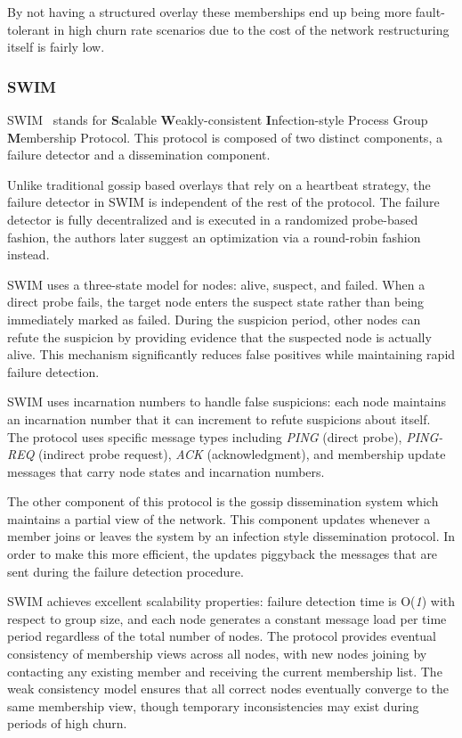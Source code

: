By not having a structured overlay these memberships end up being more fault-tolerant
in high churn rate scenarios due to the cost of the network restructuring
itself is fairly low.

\subsubsection{SWIM}\label{subsec:swim}

SWIM~\cite{swim} stands for \textbf{S}calable \textbf{W}eakly-consistent \textbf{I}nfection-style
Process Group \textbf{M}embership Protocol. This protocol is composed of two distinct
components, a failure detector and a dissemination component.

Unlike traditional gossip based overlays that rely on a heartbeat strategy,
the failure detector in SWIM is independent of the rest of the protocol.
The failure detector is fully decentralized and is executed in a randomized
probe-based fashion, the authors later suggest an optimization via a round-robin
fashion instead.

SWIM uses a three-state model for nodes: alive, suspect, and failed. When a direct probe fails,
the target node enters the suspect state rather than being immediately marked as failed.
During the suspicion period, other nodes can refute the suspicion by providing evidence
that the suspected node is actually alive. This mechanism significantly reduces false positives
while maintaining rapid failure detection.

SWIM uses incarnation numbers to handle false suspicions: each node maintains an incarnation
number that it can increment to refute suspicions about itself. The protocol uses specific
message types including \textit{PING} (direct probe), \textit{PING-REQ} (indirect probe request), \textit{ACK} (acknowledgment),
and membership update messages that carry node states and incarnation numbers.

The other component of this protocol is the gossip dissemination system which
maintains a partial view of the network. This component updates whenever a member
joins or leaves the system by an infection style dissemination protocol. In order to
make this more efficient, the updates piggyback the messages that are sent during the
failure detection procedure.

SWIM achieves excellent scalability properties: failure detection time is O(\textit{1}) with respect to group size,
and each node generates a constant message load per time period regardless of the total number of nodes.
The protocol provides eventual consistency of membership views across all nodes, with new nodes joining
by contacting any existing member and receiving the current membership list. The weak consistency model
ensures that all correct nodes eventually converge to the same membership view, though temporary
inconsistencies may exist during periods of high churn.

